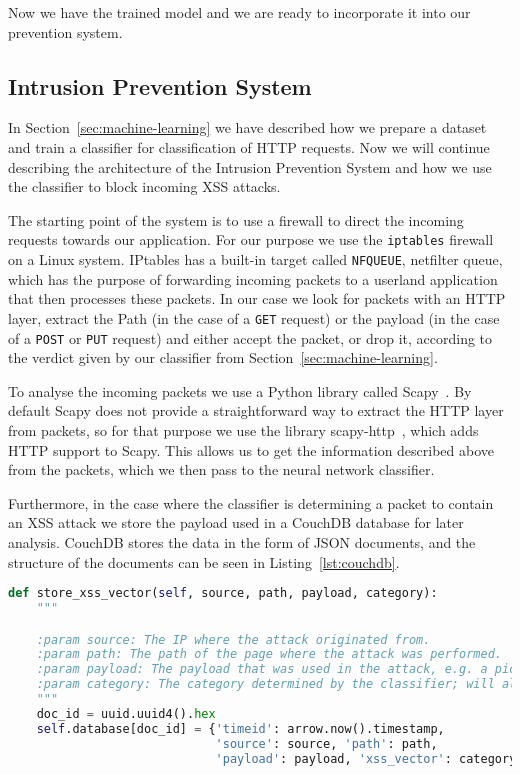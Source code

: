 \documentclass[10pt,journal,compsoc]{IEEEtran}
\begin{document}
Now we have the trained model and we are ready to incorporate it into our prevention system.


\subsection{Intrusion Prevention System}
\label{sec:ips}

In Section~\ref{sec:machine-learning} we have described how we prepare a dataset and train a classifier
for classification of HTTP requests. Now we will continue describing the architecture of the Intrusion Prevention System
and how we use the classifier to block incoming XSS attacks.

The starting point of the system is to use a firewall to direct the incoming requests towards our application.
For our purpose we use the \verb|iptables| firewall on a Linux system. IPtables has a built-in target called
\verb|NFQUEUE|, netfilter queue, which has the purpose of forwarding incoming packets to a userland application
that then processes these packets. In our case we look for packets with an HTTP layer, extract the Path
(in the case of a \verb|GET| request) or the payload (in the case of a \verb|POST| or \verb|PUT| request) and either
accept the packet, or drop it, according to the verdict given by our classifier from Section~\ref{sec:machine-learning}.

To analyse the incoming packets we use a Python library called Scapy~\citep*{scapy}. By default Scapy does not provide
a straightforward way to extract the HTTP layer from packets, so for that purpose we use the library
scapy-http~\citep*{scapy-http}, which adds HTTP support to Scapy. This allows us to get the information described above
from the packets, which we then pass to the neural network classifier.

Furthermore, in the case where the classifier is determining a packet to contain an XSS attack we store the payload used
in a CouchDB database for later analysis. CouchDB stores the data in the form of JSON documents, and the structure of
the documents can be seen in Listing~\ref{lst:couchdb}.

\begin{lstlisting}[language=Python, caption={The Python function that stores information about XSS attacks in CouchDB.},
                    label={lst:couchdb}]
def store_xss_vector(self, source, path, payload, category):
    """

    :param source: The IP where the attack originated from.
    :param path: The path of the page where the attack was performed.
    :param payload: The payload that was used in the attack, e.g. a pice of JavaScript.
    :param category: The category determined by the classifier; will always be one.
    """
    doc_id = uuid.uuid4().hex
    self.database[doc_id] = {'timeid': arrow.now().timestamp,
                             'source': source, 'path': path,
                             'payload': payload, 'xss_vector': category}

\end{lstlisting}
\end{document}
